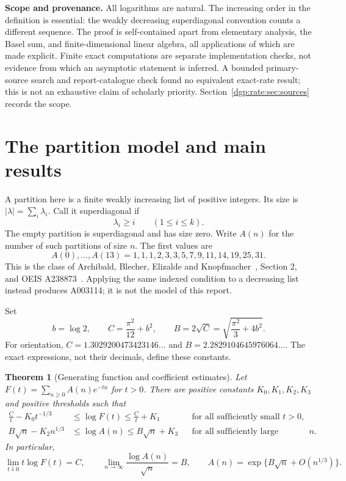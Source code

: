 \documentclass[11pt,letterpaper]{article}
\numberwithin{equation}{section}
\newtheorem{theorem}{Theorem}[section]
\theoremstyle{remark}\newtheorem{remark}[theorem]{Remark}
\begin{document}
\noindent\textbf{Scope and provenance.}
All logarithms are natural. The increasing order in the definition is
essential: the weakly decreasing superdiagonal convention counts a
different sequence. The proof is self-contained apart from elementary
analysis, the Basel sum, and finite-dimensional linear algebra, all
applications of which are made explicit. Finite exact computations are
separate implementation checks, not evidence from which an asymptotic
statement is inferred. A bounded primary-source search and report-catalogue
check found no equivalent exact-rate result; this is not an exhaustive
claim of scholarly priority. Section~\ref{dgp:rate:sec:sources} records the scope.
\medskip

\section{The partition model and main results}\label{dgp:rate:sec:main}
A partition here is a finite weakly increasing list of positive integers.
Its size is $|\lambda|=\sum_i\lambda_i$. Call it superdiagonal if
\begin{equation}\label{dgp:rate:eq:model}
 \lambda_i\geq i\qquad(1\leq i\leq k).
\end{equation}
The empty partition is superdiagonal and has size zero. Write $A(n)$ for
the number of such partitions of size $n$. The first values are
\[
 A(0),\ldots,A(13)=1,1,1,2,3,3,5,7,9,11,14,19,25,31.
\]
This is the class of Archibald, Blecher, Elizalde and
Knopfmacher~\cite{abek}, Section 2, and OEIS A238873~\cite{oeisA238873}.
Applying the same indexed condition to a decreasing list instead produces
A003114; it is not the model of this report.

Set
\begin{equation}\label{dgp:rate:eq:constants}
 b=\log2,\qquad C=\frac{\pi^2}{12}+b^2,
 \qquad B=2\sqrt C=\sqrt{\frac{\pi^2}{3}+4b^2}.
\end{equation}
For orientation, $C=1.3029200473423146\ldots$ and
$B=2.2829104645976064\ldots$. The exact expressions, not their decimals,
define these constants.

\begin{theorem}[Generating function and coefficient estimates]\label{dgp:rate:thm:main}
Let $F(t)=\sum_{n\geq0}A(n)e^{-tn}$ for $t>0$. There are positive
constants $K_0,K_1,K_2,K_3$ and positive thresholds such that
\begin{align}
 \frac Ct-K_0t^{-1/3}&\leq\log F(t)\leq\frac Ct+K_1
   &&\text{for all sufficiently small }t>0,\label{dgp:rate:eq:gfmain}\\
 B\sqrt n-K_2n^{1/3}&\leq\log A(n)\leq B\sqrt n+K_3
   &&\text{for all sufficiently large integers }n.\label{dgp:rate:eq:coefmain}
\end{align}
In particular,
\begin{equation}\label{dgp:rate:eq:limits}
 \lim_{t\downarrow0}t\log F(t)=C,\qquad
 \lim_{n\to\infty}\frac{\log A(n)}{\sqrt n}=B,
 \qquad A(n)=\exp\{B\sqrt n+O(n^{1/3})\}.
\end{equation}
\end{theorem}
\end{document}
